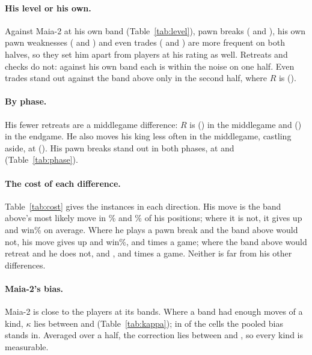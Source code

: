 \documentclass[11pt]{article}
\begin{document}
\paragraph{His level or his own.} Against Maia-2 at his own band (Table~\ref{tab:level}), pawn
breaks (\BreakRhisFirst{} and \BreakRhisSecond), his own pawn weaknesses (\WeakRhisFirst{} and
\WeakRhisSecond) and even trades (\TradeRhisFirst{} and \TradeRhisSecond) are more frequent on both
halves, so they set him apart from players at his rating as well. Retreats and checks do not:
against his own band each is within the noise on one half. Even trades stand out against the band
above only in the second half, where $R$ is \TradeRSecond{} (\TradeRSecondCi).

\LevelTable

\PhaseTable

\paragraph{By phase.} His fewer retreats are a middlegame difference: $R$ is \RetreatMid{}
(\RetreatMidCi) in the middlegame and \RetreatEnd{} (\RetreatEndCi) in the endgame. He also moves
his king less often in the middlegame, castling aside, at \KingMid{} (\KingMidCi). His pawn breaks
stand out in both phases, at \BreakMid{} and \BreakEnd{} (Table~\ref{tab:phase}).

\CostTable

\paragraph{The cost of each difference.} Table~\ref{tab:cost} gives the instances in each
direction. His move is the band above's most likely move in \TopAboveFirst\% and
\TopAboveSecond\% of his positions; where it is not, it gives up \DiffDFirst{} and \DiffDSecond{}
win\% on average. Where he plays a pawn break and the band above would not, his move gives up
\BreakDFirst{} and \BreakDSecond{} win\%, \BreakPerGameFirst{} and \BreakPerGameSecond{} times a
game; where the band above would retreat and he does not, \RetreatDFirst{} and \RetreatDSecond,
\RetreatPerGameFirst{} and \RetreatPerGameSecond{} times a game. Neither is far from his other
differences.

\KappaTable

\paragraph{Maia-2's bias.} Maia-2 is close to the players at its bands. Where a band had enough
moves of a kind, $\kappa$ lies between \KappaMin{} and \KappaMax{} (Table~\ref{tab:kappa}); in
\KappaPooled{} of the \KappaCells{} cells the pooled bias stands in. Averaged over a half, the
correction lies between \CorrMin{} and \CorrMax, so every kind is measurable.
\end{document}
